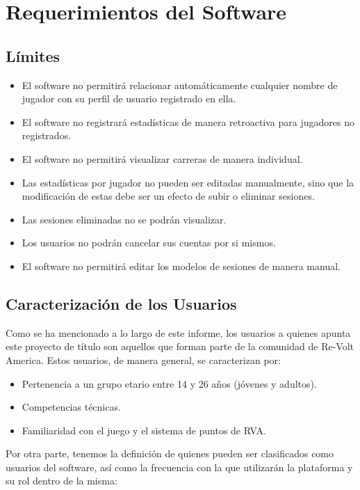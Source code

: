 \chapter{Requerimientos del Software}

\section{Límites}

\begin{itemize}
	\item El software no permitirá relacionar automáticamente cualquier nombre de jugador con su perfil de usuario registrado en ella.
	\item El software no registrará estadísticas de manera retroactiva para jugadores no registrados.
	\item El software no permitirá visualizar carreras de manera individual.
	\item Las estadísticas por jugador no pueden ser editadas manualmente, sino que la modificación de estas debe ser un efecto de subir o eliminar sesiones.
	\item Las sesiones eliminadas no se podrán visualizar.
	\item Los usuarios no podrán cancelar sus cuentas por si mismos.
	\item El software no permitirá editar los modelos de sesiones de manera manual.
\end{itemize}

\section{Caracterización de los Usuarios}
Como se ha mencionado a lo largo de este informe, los usuarios a quienes apunta este proyecto de título son aquellos que forman parte de la comunidad de Re-Volt America. Estos usuarios, de manera general, se caracterizan por:

\begin{itemize}
	\item Pertenencia a un grupo etario entre 14 y 26 años (jóvenes y adultos).
	\item Competencias técnicas.
	\item Familiaridad con el juego y el sistema  de puntos de RVA.
\end{itemize}

Por otra parte, tenemos la definición de quienes pueden ser clasificados como usuarios del software, así como la frecuencia con la que utilizarán la plataforma y su rol dentro de la misma:

